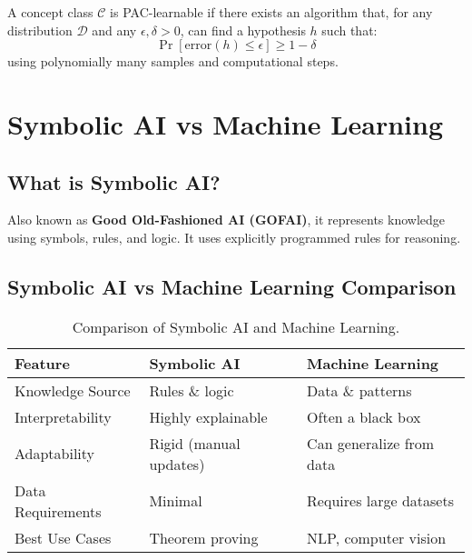 A concept class \(\mathcal{C}\) is PAC-learnable if there exists an algorithm that, for any distribution \(\mathcal{D}\) and any \(\epsilon, \delta > 0\), can find a hypothesis \(h\) such that:
\[\Pr[\text{error}(h) \leq \epsilon] \geq 1 - \delta\]
using polynomially many samples and computational steps.

\section{Symbolic AI vs Machine Learning}
\subsection{What is Symbolic AI?}
Also known as \textbf{Good Old-Fashioned AI (GOFAI)}, it represents knowledge using symbols, rules, and logic. It uses explicitly programmed rules for reasoning.

\subsection{Symbolic AI vs Machine Learning Comparison}
\begin{table}[h!]
\centering
\begin{tabular}{|l|l|l|}
\hline
\textbf{Feature} & \textbf{Symbolic AI} & \textbf{Machine Learning} \\
\hline
Knowledge Source & Rules \& logic & Data \& patterns \\
Interpretability & Highly explainable & Often a black box \\
Adaptability & Rigid (manual updates) & Can generalize from data \\
Data Requirements & Minimal & Requires large datasets \\
Best Use Cases & Theorem proving & NLP, computer vision \\
\hline
\end{tabular}
\caption{Comparison of Symbolic AI and Machine Learning.}
\end{table}
